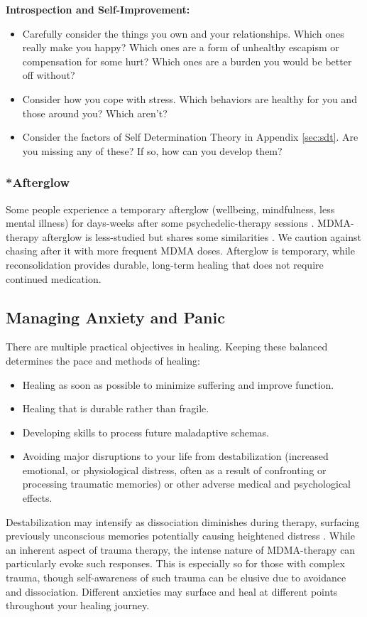 \documentclass[12pt,letterpaper]{article}
\begin{document}
\noindent \textbf{Introspection and Self-Improvement:} 
\begin{itemize}
    \item Carefully consider the things you own and your relationships. Which ones really make you happy? Which ones are a form of unhealthy escapism or compensation for some hurt? Which ones are a burden you would be better off without?
    \item Consider how you cope with stress. Which behaviors are healthy for you and those around you? Which aren't?
    \item Consider the factors of Self Determination Theory in Appendix \ref{sec:sdt}. Are you missing any of these? If so, how can you develop them?
\end{itemize}
\subsubsection{*Afterglow}
Some people experience a temporary afterglow (wellbeing, mindfulness, less mental illness) for days-weeks after some psychedelic-therapy sessions \cite{evansAfterglow}. MDMA-therapy afterglow is less-studied but shares some similarities \cite{sessaAfterglow}. We caution against chasing after it with more frequent MDMA doses. Afterglow is temporary, while reconsolidation provides durable, long-term healing that does not require continued medication.
\subsection{Managing Anxiety and Panic}
\label{sectionManagement}
There are multiple practical objectives in healing. Keeping these balanced determines the pace and methods of healing:
\begin{itemize}
    \item Healing as soon as possible to minimize suffering and improve function.
    \item Healing that is durable rather than fragile.
    \item Developing skills to process future maladaptive schemas.
    \item Avoiding major disruptions to your life from destabilization (increased emotional, or physiological distress, often as a result of confronting or processing traumatic memories) or other adverse medical and psychological effects.
\end{itemize}
Destabilization may intensify as dissociation diminishes during therapy, surfacing previously unconscious memories potentially causing heightened distress \cite{vanderKolkBody}. While an inherent aspect of trauma therapy, the intense nature of MDMA-therapy can particularly evoke such responses. This is especially so for those with complex trauma, though self-awareness of such trauma can be elusive due to avoidance and dissociation. Different anxieties may surface and heal at different points throughout your healing journey.
\end{document}
